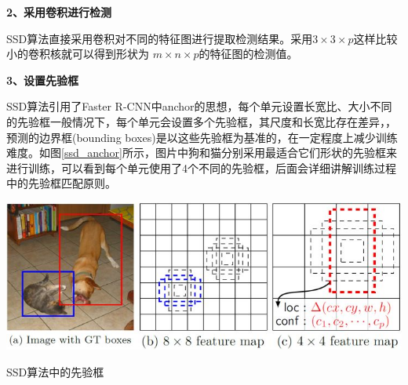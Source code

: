 \textbf{2、采用卷积进行检测}

SSD算法直接采用卷积对不同的特征图进行提取检测结果。采用$ 3\times 3 \times p $这样比较小的卷积核就可以得到形状为 $m\times n \times p $的特征图的检测值。 

\textbf{3、设置先验框 }

SSD算法引用了Faster R-CNN中anchor的思想，每个单元设置长宽比、大小不同的先验框一般情况下，每个单元会设置多个先验框，其尺度和长宽比存在差异，，预测的边界框(bounding boxes)是以这些先验框为基准的，在一定程度上减少训练难度。如图\ref{ssd_anchor}所示，图片中狗和猫分别采用最适合它们形状的先验框来进行训练，可以看到每个单元使用了4个不同的先验框，后面会详细讲解训练过程中的先验框匹配原则。
\begin{uscfigure}
	\includegraphics[width=\textwidth]{./Pictures/ssd_(3).jpg}	
	\caption{SSD算法中的先验框}
	\label{ssd_anchor}
\end{uscfigure}